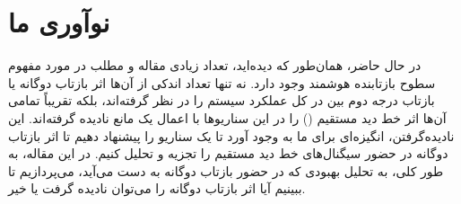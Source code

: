 \section{نوآوری ما}

در حال حاضر، همان‌طور که دیده‌اید، تعداد زیادی مقاله و مطلب در مورد مفهوم سطوح بازتابنده هوشمند وجود دارد. نه تنها تعداد اندکی از آن‌ها اثر بازتاب دوگانه یا بازتاب درجه دوم بین  در کل عملکرد سیستم را در نظر گرفته‌اند، بلکه تقریباً تمامی آن‌ها اثر خط دید مستقیم () را در این سناریوها با اعمال یک مانع نادیده گرفته‌اند. این نادیده‌گرفتن، انگیزه‌ای برای ما به وجود آورد تا یک سناریو را پیشنهاد دهیم تا اثر بازتاب دوگانه در حضور سیگنال‌های خط دید مستقیم را تجزیه و تحلیل کنیم. در این مقاله، به طور کلی، به تحلیل بهبودی که در حضور بازتاب دوگانه به دست می‌آید، می‌پردازیم تا ببینیم آیا اثر بازتاب دوگانه را می‌توان نادیده گرفت یا خیر.


\newpage
‌